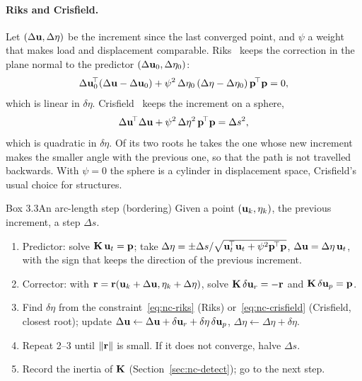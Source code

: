 \paragraph{Riks and Crisfield.}
Let $(\Delta\mathbf{u},\Delta\eta)$ be the increment since the last converged point, and
$\psi$ a weight that makes load and displacement comparable. Riks~\cite{nc-riks1979}
keeps the correction in the plane normal to the predictor
$(\Delta\mathbf{u}_0,\Delta\eta_0)$:
\begin{equation}\label{eq:nc-riks}
  \Delta\mathbf{u}_0^{\!\top}(\Delta\mathbf{u} - \Delta\mathbf{u}_0) + \psi^2\,\Delta\eta_0\,(\Delta\eta - \Delta\eta_0)\,\mathbf{p}^{\!\top}\mathbf{p} = 0,
\end{equation}
which is linear in $\delta\eta$. Crisfield~\cite{nc-crisfield1981} keeps the increment on
a sphere,
\begin{equation}\label{eq:nc-crisfield}
  \Delta\mathbf{u}^{\!\top}\Delta\mathbf{u} + \psi^2\,\Delta\eta^2\,\mathbf{p}^{\!\top}\mathbf{p} = \Delta s^2,
\end{equation}
which is quadratic in $\delta\eta$. Of its two roots he takes the one whose new increment
makes the smaller angle with the previous one, so that the path is not travelled
backwards. With $\psi = 0$ the sphere is a cylinder in displacement space, Crisfield's
usual choice for structures.

\begin{gbox}{Box 3.3\quad An arc-length step (bordering)}\label{sec:nc-box-arc}
%
Given a point $(\mathbf{u}_k,\eta_k)$, the previous increment, a step $\Delta s$.
\begin{enumerate}
  \item Predictor: solve $\mathbf{K}\,\mathbf{u}_t = \mathbf{p}$; take
        $\Delta\eta = \pm\Delta s/\sqrt{\mathbf{u}_t^{\!\top}\mathbf{u}_t + \psi^2\mathbf{p}^{\!\top}\mathbf{p}}$,
        $\Delta\mathbf{u} = \Delta\eta\,\mathbf{u}_t$, with the sign that keeps the direction of
        the previous increment.
  \item Corrector: with $\mathbf{r} = \mathbf{r}(\mathbf{u}_k + \Delta\mathbf{u},\eta_k + \Delta\eta)$, solve
        $\mathbf{K}\,\delta\mathbf{u}_r = -\mathbf{r}$ and $\mathbf{K}\,\delta\mathbf{u}_p = \mathbf{p}$.
  \item Find $\delta\eta$ from the constraint~\eqref{eq:nc-riks} (Riks) or~\eqref{eq:nc-crisfield}
        (Crisfield, closest root); update $\Delta\mathbf{u} \leftarrow \Delta\mathbf{u} + \delta\mathbf{u}_r + \delta\eta\,\delta\mathbf{u}_p$,
        $\Delta\eta \leftarrow \Delta\eta + \delta\eta$.
  \item Repeat 2--3 until $\lVert \mathbf{r}\rVert$ is small. If it does not converge, halve $\Delta s$.
  \item Record the inertia of $\mathbf{K}$ (Section~\ref{sec:nc-detect}); go to the next step.
\end{enumerate}
\end{gbox}

